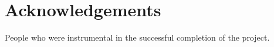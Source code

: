 \chapter*{Acknowledgements}

  People who were instrumental in the successful completion of the project.